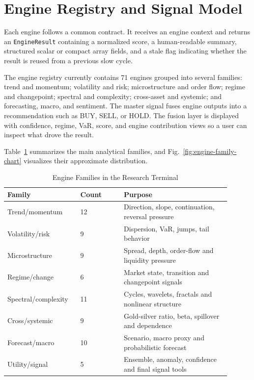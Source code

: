 \documentclass[conference]{IEEEtran}
\begin{document}
\section{Engine Registry and Signal Model}

Each engine follows a common contract. It receives an engine context and
returns an \texttt{EngineResult} containing a normalized score, a
human-readable summary, structured scalar or compact array fields, and a
stale flag indicating whether the result is reused from a previous slow
cycle.

The engine registry currently contains 71 engines grouped into several
families: trend and momentum; volatility and risk; microstructure and order
flow; regime and changepoint; spectral and complexity; cross-asset and
systemic; and forecasting, macro, and sentiment. The master signal fuses
engine outputs into a recommendation such as BUY, SELL, or HOLD. The fusion
layer is displayed with confidence, regime, VaR, score, and engine
contribution views so a user can inspect what drove the result.

Table~\ref{tab:engine-families} summarizes the main analytical families, and
Fig.~\ref{fig:engine-family-chart} visualizes their approximate distribution.

\begin{table}[!t]
\caption{Engine Families in the Research Terminal}
\label{tab:engine-families}
\centering
\begin{tabular}{@{}p{0.28\linewidth}p{0.18\linewidth}p{0.44\linewidth}@{}}
\toprule
\textbf{Family} & \textbf{Count} & \textbf{Purpose} \\
\midrule
Trend/momentum & 12 & Direction, slope, continuation, reversal pressure \\
Volatility/risk & 9 & Dispersion, VaR, jumps, tail behavior \\
Microstructure & 9 & Spread, depth, order-flow and liquidity pressure \\
Regime/change & 6 & Market state, transition and changepoint signals \\
Spectral/complexity & 11 & Cycles, wavelets, fractals and nonlinear structure \\
Cross/systemic & 9 & Gold-silver ratio, beta, spillover and dependence \\
Forecast/macro & 10 & Scenario, macro proxy and probabilistic forecast \\
Utility/signal & 5 & Ensemble, anomaly, confidence and final signal tools \\
\bottomrule
\end{tabular}
\end{table}
\end{document}
